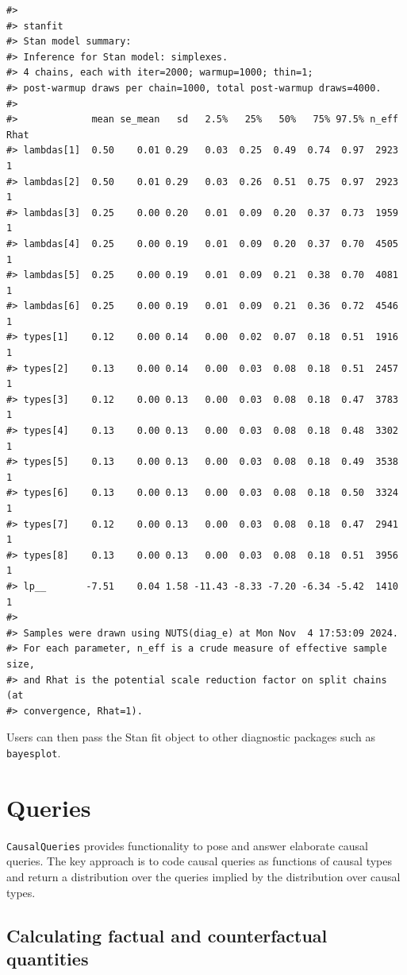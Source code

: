 \documentclass[
  11pt,
  article]{jss}
\begin{document}
\begin{verbatim}
#> 
#> stanfit
#> Stan model summary:
#> Inference for Stan model: simplexes.
#> 4 chains, each with iter=2000; warmup=1000; thin=1; 
#> post-warmup draws per chain=1000, total post-warmup draws=4000.
#> 
#>             mean se_mean   sd   2.5%   25%   50%   75% 97.5% n_eff Rhat
#> lambdas[1]  0.50    0.01 0.29   0.03  0.25  0.49  0.74  0.97  2923    1
#> lambdas[2]  0.50    0.01 0.29   0.03  0.26  0.51  0.75  0.97  2923    1
#> lambdas[3]  0.25    0.00 0.20   0.01  0.09  0.20  0.37  0.73  1959    1
#> lambdas[4]  0.25    0.00 0.19   0.01  0.09  0.20  0.37  0.70  4505    1
#> lambdas[5]  0.25    0.00 0.19   0.01  0.09  0.21  0.38  0.70  4081    1
#> lambdas[6]  0.25    0.00 0.19   0.01  0.09  0.21  0.36  0.72  4546    1
#> types[1]    0.12    0.00 0.14   0.00  0.02  0.07  0.18  0.51  1916    1
#> types[2]    0.13    0.00 0.14   0.00  0.03  0.08  0.18  0.51  2457    1
#> types[3]    0.12    0.00 0.13   0.00  0.03  0.08  0.18  0.47  3783    1
#> types[4]    0.13    0.00 0.13   0.00  0.03  0.08  0.18  0.48  3302    1
#> types[5]    0.13    0.00 0.13   0.00  0.03  0.08  0.18  0.49  3538    1
#> types[6]    0.13    0.00 0.13   0.00  0.03  0.08  0.18  0.50  3324    1
#> types[7]    0.12    0.00 0.13   0.00  0.03  0.08  0.18  0.47  2941    1
#> types[8]    0.13    0.00 0.13   0.00  0.03  0.08  0.18  0.51  3956    1
#> lp__       -7.51    0.04 1.58 -11.43 -8.33 -7.20 -6.34 -5.42  1410    1
#> 
#> Samples were drawn using NUTS(diag_e) at Mon Nov  4 17:53:09 2024.
#> For each parameter, n_eff is a crude measure of effective sample size,
#> and Rhat is the potential scale reduction factor on split chains (at 
#> convergence, Rhat=1).
\end{verbatim}

Users can then pass the Stan fit object to other diagnostic packages
such as \texttt{bayesplot}.

\section{Queries}\label{sec-query}

\texttt{CausalQueries} provides functionality to pose and answer
elaborate causal queries. The key approach is to code causal queries as
functions of causal types and return a distribution over the queries
implied by the distribution over causal types.

\subsection{Calculating factual and counterfactual
quantities}\label{sec-propagation}
\end{document}
